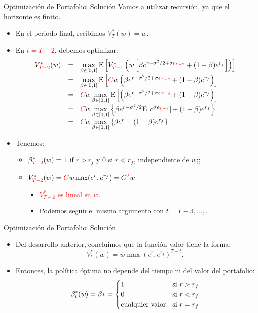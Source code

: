 \documentclass[handout]{beamer}
\begin{document}
\begin{frame}{Optimización de Portafolio: Solución}
Vamos a utilizar recursión, ya que el horizonte es finito.
\begin{itemize}
\item En el periodo final, recibimos $V^*_T(w) = w$.
\item En \textcolor{red}{$t = T-2$}, debemos optimizar:
$$
\begin{array}{ccl}
V_{\textcolor{red}{T-2}}^*(w) & = & \max\limits_{\beta \in [0,1]} {\rm E}\left[V_{\textcolor{red}{T-1}}^*\left(w\left[\beta e^{r-\sigma^2/2+\sigma \epsilon_{\textcolor{red}{T-2}}}+(1-\beta)e^{r_f}\right]\right)\right]\\
& = &\max\limits_{\beta \in [0,1]} {\rm E}\left[\textcolor{red}{C} w\left(\beta e^{r-\sigma^2/2+\sigma \epsilon_{\textcolor{red}{T-2}}}+(1-\beta)e^{r_f}\right)\right]\\
& = & \textcolor{red}{C} w \max\limits_{\beta \in [0,1]}{\rm E}\left[\left(\beta e^{r-\sigma^2/2+\sigma \epsilon_{\textcolor{red}{T-2}}}+(1-\beta)e^{r_f}\right)\right] \\& = & \textcolor{red}{C}w \max\limits_{\beta \in [0,1]}\left\{\beta e^{r-\sigma^2/2} {\rm E}\left[e^{\sigma \epsilon_{\textcolor{red}{T-2}}}\right]+(1-\beta)e^{r_f}\right\} \\& = & \textcolor{red}{C}w\max\limits_{\beta \in [0,1]} \left\{\beta e^r + (1-\beta)e^{r_f}\right\} 
\end{array}
$$
\item Tenemos:
\begin{itemize}
    \item $\beta_{\textcolor{red}{T-2}}^*(w) = 1$ if $r>r_f$ y 0 si $r<r_f$, independiente de $w$;;
    \item $V_{\textcolor{red}{T-2}}^*(w) = \textcolor{red}{C} w \max(e^r, e^{r_f}) = C^{\textcolor{red}{2}}w$
    \begin{itemize}
    \item \textcolor{red}{$V_{T-2}^*$ es lineal en $w$.}
    \item<2-> Podemos seguir el mismo argumento con $t = T-3,...,$.
    \end{itemize}
\end{itemize}
\end{itemize}
\end{frame}

\begin{frame}{Optimización de Portafolio: Solución}
\begin{itemize}
\item Del desarrollo anterior, concluimos que la función valor tiene la forma:
$$
V_t^*(w) = w \max(e^r, e^{r_f})^{T-t}.
$$
\item<4-> Entonces, la política óptima no depende del tiempo ni del valor del portafolio: 
$$
\beta_{t}^*(w) = \beta* = \begin{cases}
1 & {\rm si~} r>r_f \\
0 & {\rm si~} r<r_f \\
{\rm cualquier~valor} &{\rm si~}r=r_f
\end{cases}
$$
\end{itemize}
\end{frame}
\end{document}
